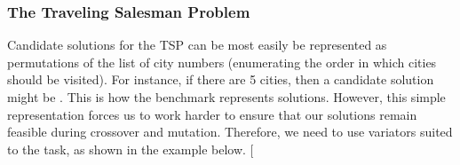 \documentclass[letterpaper,10pt,english]{sphinxmanual}
\begin{document}
\subsubsection{The Traveling Salesman Problem}
\label{examples:the-traveling-salesman-problem}
Candidate solutions for the TSP can be most easily be represented as permutations
of the list of city numbers (enumerating the order in which cities should be
visited). For instance, if there are 5 cities, then a candidate solution might
be \code{{[}4, 1, 0, 2, 3{]}}. This is how the  benchmark represents solutions.
However, this simple representation forces us to work harder to ensure that our
solutions remain feasible during crossover and mutation. Therefore, we need
to use variators suited to the task, as shown in the example below.
{[}\code{download}{]}
\end{document}
